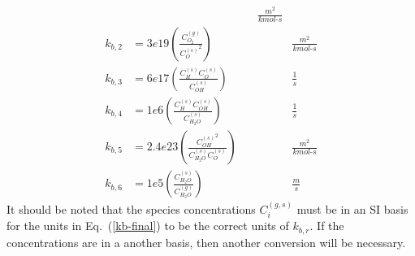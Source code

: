 \documentclass[a4paper]{report}
\newcommand{\eref}[1]{Eq.~(\ref{#1})}
\newcommand{\kb}[1]{k_{b,#1}}
\newcommand{\cg}[1]{{C_{#1}^{(g)}}}
\newcommand{\cs}[1]{{C_{#1}^{(s)}}}
\begin{document}
\begin{enumerate}
\begin{equation}
{\begin{alignedat}{2}
                \quad && \frac{m^2}{kmol\text{-}s} \\
      \kb{2} &= 3e19   \left(\frac{\cg{O_2}}{\cs{O}^2}\right)
                \quad && \frac{m^2}{kmol\text{-}s} \\
      \kb{3} &= 6e17   \left(\frac{\cs{H}\cs{O}}{\cs{OH}}\right)
                \quad && \frac{1}{s} \\
      \kb{4} &= 1e6    \left(\frac{\cs{H}\cs{OH}}{\cs{H_2O}}\right)
                \quad && \frac{1}{s} \\
      \kb{5} &= 2.4e23 \left(\frac{\cs{OH}^2}{\cs{H_2O}\cs{O}}\right)
                \quad && \frac{m^2}{kmol\text{-}s} \\
      \kb{6} &= 1e5    \left(\frac{\cs{H_2O}}{\cg{H_2O}}\right)
                \quad && \frac{m}{s}
    \end{alignedat}}
    \label{kb-final}
  \end{equation}
  It should be noted that the species concentrations $C_{i}^{(g,s)}$ must be in
  an SI basis for the units in \eref{kb-final} to be the correct units of
  $\kb{r}$.  If the concentrations are in a another basis, then another
  conversion will be necessary.

\end{enumerate}
\end{document}
